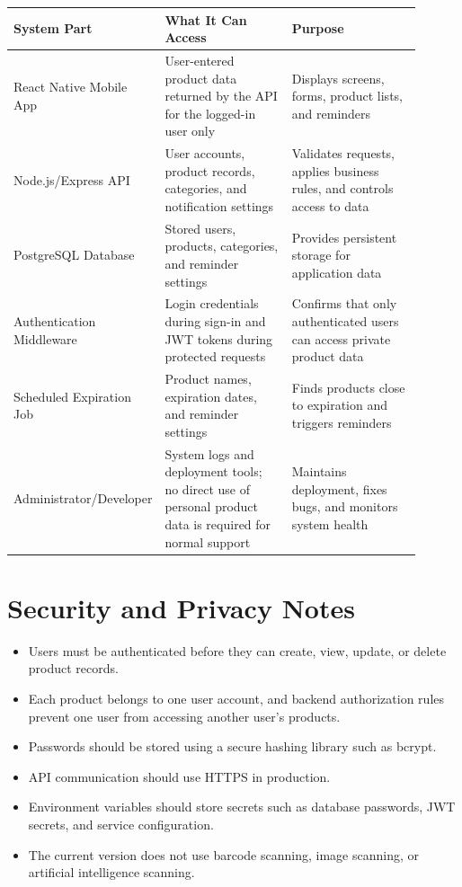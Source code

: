 \documentclass[12pt]{article}
\begin{document}
\begin{longtable}{|p{0.22\linewidth}|p{0.34\linewidth}|p{0.34\linewidth}|}
\hline
\textbf{System Part} & \textbf{What It Can Access} & \textbf{Purpose} \\
\hline
React Native Mobile App & User-entered product data returned by the API for the logged-in user only & Displays screens, forms, product lists, and reminders \\
\hline
Node.js/Express API & User accounts, product records, categories, and notification settings & Validates requests, applies business rules, and controls access to data \\
\hline
PostgreSQL Database & Stored users, products, categories, and reminder settings & Provides persistent storage for application data \\
\hline
Authentication Middleware & Login credentials during sign-in and JWT tokens during protected requests & Confirms that only authenticated users can access private product data \\
\hline
Scheduled Expiration Job & Product names, expiration dates, and reminder settings & Finds products close to expiration and triggers reminders \\
\hline
Administrator/Developer & System logs and deployment tools; no direct use of personal product data is required for normal support & Maintains deployment, fixes bugs, and monitors system health \\
\hline
\end{longtable}

\section*{Security and Privacy Notes}

\begin{itemize}[leftmargin=*]
    \item Users must be authenticated before they can create, view, update, or delete product records.
    \item Each product belongs to one user account, and backend authorization rules prevent one user from accessing another user's products.
    \item Passwords should be stored using a secure hashing library such as bcrypt.
    \item API communication should use HTTPS in production.
    \item Environment variables should store secrets such as database passwords, JWT secrets, and service configuration.
    \item The current version does not use barcode scanning, image scanning, or artificial intelligence scanning.
\end{itemize}
\end{document}
